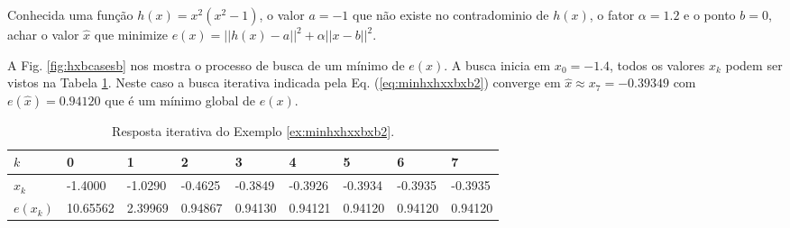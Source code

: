 \begin{example}\label{ex:minhxhxxbxb2}
Conhecida uma função $h(x)=x^2(x^2-1)$, o valor $a=-1$ que não existe no contradominio de $h(x)$,
o fator $\alpha=1.2$ e o ponto $b=0$,
achar o valor $\hat{x}$ que minimize $e(x)=||h(x)-a||^2+\alpha||x-b||^2$.
\end{example}
\begin{SolutionT}\label{sol:minhxhxxbxb2}
 A Fig. \ref{fig:hxbcasesb} nos mostra o processo de busca de um mínimo
 de $e(x)$. A busca inicia em $x_0=-1.4$,
 todos os valores $x_{k}$ podem ser vistos na 
Tabela \ref{tab:hxbcases2}. Neste caso a busca iterativa indicada pela Eq. (\ref{eq:minhxhxxbxb2}) converge
em $\hat{x}\approx x_7=-0.39349$ com $e(\hat{x})=0.94120$ que é um mínimo global de $e(x)$.

\end{SolutionT}

\begin{table}[!h]
\centering
\begin{tabular}{|l|l|l|l|l|l|l|l|l|}
\hline
$k$      & 0 & 1 & 2 & 3 & 4 & 5 & 6 & 7 \\ \hline
$x_k$    & -1.4000 & -1.0290 & -0.4625 & -0.3849 & -0.3926 & -0.3934 & -0.3935 & -0.3935 \\ \hline
$e(x_k)$ & 10.65562 &  2.39969 &  0.94867 &  0.94130 &  0.94121 &  0.94120 &  0.94120 &  0.94120 \\ \hline
\end{tabular}
\caption{Resposta iterativa do Exemplo \ref{ex:minhxhxxbxb2}.}
\label{tab:hxbcases2}
\end{table}


